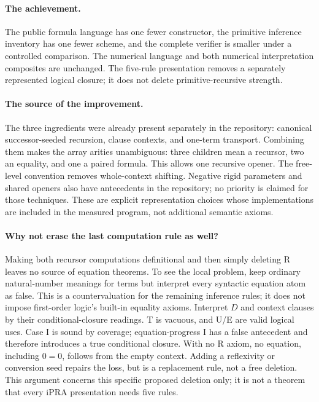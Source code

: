 \documentclass[11pt,letterpaper]{article}
\theoremstyle{definition}\newtheorem{definition}[theorem]{Definition}
\begin{document}
\paragraph{The achievement.}
The public formula language has one fewer constructor, the primitive inference inventory has one fewer scheme, and the complete verifier is smaller under a controlled comparison. The numerical language and both numerical interpretation composites are unchanged. The five-rule presentation removes a separately represented logical closure; it does not delete primitive-recursive strength.

\paragraph{The source of the improvement.}
The three ingredients were already present separately in the repository: canonical successor-seeded recursion, clause contexts, and one-term transport. Combining them makes the array arities unambiguous: three children mean a recursor, two an equality, and one a paired formula. This allows one recursive opener. The free-level convention removes whole-context shifting. Negative rigid parameters and shared openers also have antecedents in the repository; no priority is claimed for those techniques. These are explicit representation choices whose implementations are included in the measured program, not additional semantic axioms.

\paragraph{Why not erase the last computation rule as well?}
Making both recursor computations definitional and then simply deleting R leaves no source of equation theorems. To see the local problem, keep ordinary natural-number meanings for terms but interpret every syntactic equation atom as false. This is a countervaluation for the remaining inference rules; it does not impose first-order logic's built-in equality axioms. Interpret $D$ and context clauses by their conditional-closure readings. T is vacuous, and U/E are valid logical uses. Case I is sound by coverage; equation-progress I has a false antecedent and therefore introduces a true conditional closure. With no R axiom, no equation, including $0=0$, follows from the empty context. Adding a reflexivity or conversion seed repairs the loss, but is a replacement rule, not a free deletion. This argument concerns this specific proposed deletion only; it is not a theorem that every iPRA presentation needs five rules.
\end{document}
